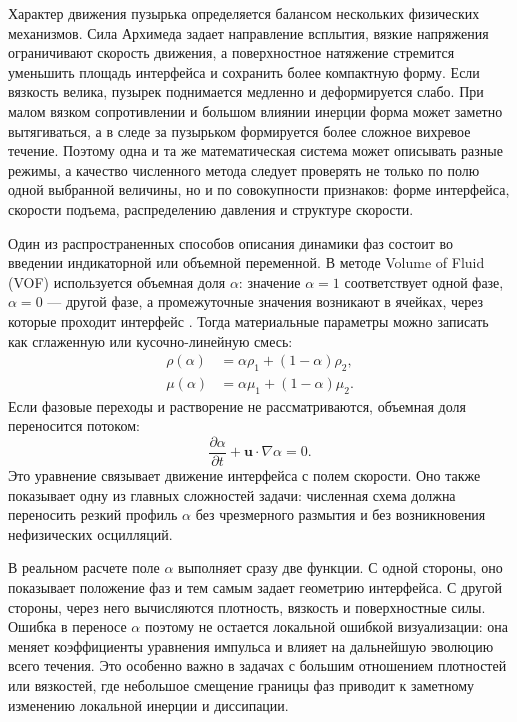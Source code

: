 Характер движения пузырька определяется балансом нескольких физических
механизмов. Сила Архимеда задает направление всплытия, вязкие напряжения
ограничивают скорость движения, а поверхностное натяжение стремится уменьшить
площадь интерфейса и сохранить более компактную форму. Если вязкость велика,
пузырек поднимается медленно и деформируется слабо. При малом вязком
сопротивлении и большом влиянии инерции форма может заметно вытягиваться, а в
следе за пузырьком формируется более сложное вихревое течение. Поэтому одна и
та же математическая система может описывать разные режимы, а качество
численного метода следует проверять не только по полю одной выбранной величины, но и по
совокупности признаков: форме интерфейса, скорости подъема, распределению
давления и структуре скорости.

Один из распространенных способов описания динамики фаз состоит во введении
индикаторной или объемной переменной. В методе Volume of Fluid (VOF) используется
объемная доля \(\alpha\): значение \(\alpha=1\) соответствует одной фазе,
\(\alpha=0\) --- другой фазе, а промежуточные значения возникают в ячейках,
через которые проходит интерфейс \cite{Hirt1981}. Тогда материальные параметры
можно записать как сглаженную или кусочно-линейную смесь:
\begin{align}
    \rho(\alpha) &= \alpha\rho_1+(1-\alpha)\rho_2, \\
    \mu(\alpha) &= \alpha\mu_1+(1-\alpha)\mu_2.
\end{align}
Если фазовые переходы и растворение не рассматриваются, объемная доля
переносится потоком:
\begin{equation}
    \frac{\partial\alpha}{\partial t}
    +\mathbf{u}\cdot\nabla\alpha=0.
    \label{eq:review_alpha_transport}
\end{equation}
Это уравнение связывает движение интерфейса с полем скорости. Оно также
показывает одну из главных сложностей задачи: численная схема должна переносить
резкий профиль \(\alpha\) без чрезмерного размытия и без возникновения
нефизических осцилляций.

В реальном расчете поле \(\alpha\) выполняет сразу две функции. С одной
стороны, оно показывает положение фаз и тем самым задает геометрию интерфейса.
С другой стороны, через него вычисляются плотность, вязкость и поверхностные
силы. Ошибка в переносе \(\alpha\) поэтому не остается локальной ошибкой
визуализации: она меняет коэффициенты уравнения импульса и влияет на дальнейшую
эволюцию всего течения. Это особенно важно в задачах с большим отношением
плотностей или вязкостей, где небольшое смещение границы фаз приводит к
заметному изменению локальной инерции и диссипации.

